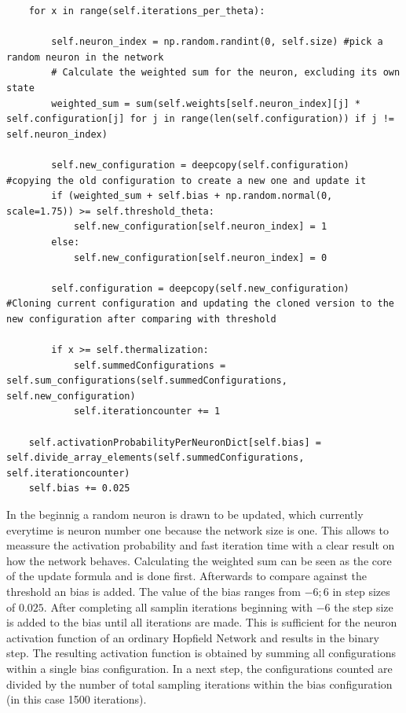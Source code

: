\begin{lstlisting}
    for x in range(self.iterations_per_theta):
                    
        self.neuron_index = np.random.randint(0, self.size) #pick a random neuron in the network
        # Calculate the weighted sum for the neuron, excluding its own state
        weighted_sum = sum(self.weights[self.neuron_index][j] * self.configuration[j] for j in range(len(self.configuration)) if j != self.neuron_index)

        self.new_configuration = deepcopy(self.configuration)   #copying the old configuration to create a new one and update it
        if (weighted_sum + self.bias + np.random.normal(0, scale=1.75)) >= self.threshold_theta:          
            self.new_configuration[self.neuron_index] = 1
        else:
            self.new_configuration[self.neuron_index] = 0
            
        self.configuration = deepcopy(self.new_configuration)   #Cloning current configuration and updating the cloned version to the new configuration after comparing with threshold

        if x >= self.thermalization:  
            self.summedConfigurations = self.sum_configurations(self.summedConfigurations, self.new_configuration)    
            self.iterationcounter += 1
        
    self.activationProbabilityPerNeuronDict[self.bias] = self.divide_array_elements(self.summedConfigurations, self.iterationcounter)
    self.bias += 0.025
\end{lstlisting}
In the beginnig a random neuron is drawn to be updated, which currently everytime is neuron number one because the network size is one. 
This allows to meassure the activation probability and fast iteration time with a clear result on how the network behaves. 
Calculating the weighted sum can be seen as the core of the update formula and is done first.
Afterwards to compare against the threshold an bias is added.
The value of the bias ranges from \(-6; 6\) in step sizes of \(0.025\). After completing all samplin iterations beginning with \(-6\) the step size is added to the bias until all iterations are made.
This is sufficient for the neuron activation function of an ordinary Hopfield Network and results in the binary step. 
The resulting activation function is obtained by summing all configurations within a single bias configuration.
In a next step, the configurations counted are divided by the number of total sampling iterations within the bias configuration (in this case 1500 iterations).
